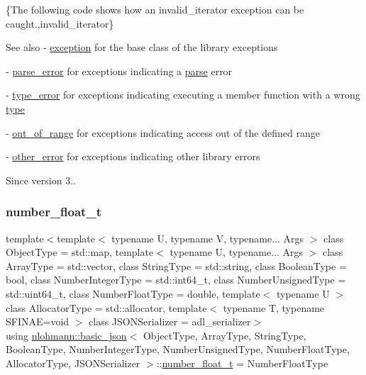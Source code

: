 \{The following code shows how an {\ttfamily invalid\+\_\+iterator} exception can be caught.,invalid\+\_\+iterator\}

\begin{DoxySeeAlso}{See also}
-\/ \mbox{\hyperlink{classnlohmann_1_1basic__json_a9a0aced019cb1d65bb49703406c84970}{exception}} for the base class of the library exceptions 

-\/ \mbox{\hyperlink{classnlohmann_1_1basic__json_af1efc2468e6022be6e35fc2944cabe4d}{parse\+\_\+error}} for exceptions indicating a \mbox{\hyperlink{classnlohmann_1_1basic__json_a265a473e939184aa42655c9ccdf34e58}{parse}} error 

-\/ \mbox{\hyperlink{classnlohmann_1_1basic__json_a4010e8e268fefd86da773c10318f2902}{type\+\_\+error}} for exceptions indicating executing a member function with a wrong \mbox{\hyperlink{classnlohmann_1_1basic__json_a2b2d781d7f2a4ee41bc0016e931cadf7}{type}} 

-\/ \mbox{\hyperlink{classnlohmann_1_1basic__json_a28f7c2f087274a0012eb7a2333ee1580}{out\+\_\+of\+\_\+range}} for exceptions indicating access out of the defined range 

-\/ \mbox{\hyperlink{classnlohmann_1_1basic__json_a3333a5a8714912adda33a35b369f7b3d}{other\+\_\+error}} for exceptions indicating other library errors
\end{DoxySeeAlso}
\begin{DoxySince}{Since}
version 3.. 
\end{DoxySince}
\mbox{\label{classnlohmann_1_1basic__json_a88d6103cb3620410b35200ee8e313d97}} 
\subsubsection{\texorpdfstring{number\+\_\+float\+\_\+t}{number\_float\_t}}
{\footnotesize\ttfamily template$<$template$<$ typename U, typename V, typename... Args $>$ class Object\+Type = std\+::map, template$<$ typename U, typename... Args $>$ class Array\+Type = std\+::vector, class String\+Type  = std\+::string, class Boolean\+Type  = bool, class Number\+Integer\+Type  = std\+::int64\+\_\+t, class Number\+Unsigned\+Type  = std\+::uint64\+\_\+t, class Number\+Float\+Type  = double, template$<$ typename U $>$ class Allocator\+Type = std\+::allocator, template$<$ typename T, typename S\+F\+I\+N\+A\+E=void $>$ class J\+S\+O\+N\+Serializer = adl\+\_\+serializer$>$ \\
using \mbox{\hyperlink{classnlohmann_1_1basic__json}{nlohmann\+::basic\+\_\+json}}$<$ Object\+Type, Array\+Type, String\+Type, Boolean\+Type, Number\+Integer\+Type, Number\+Unsigned\+Type, Number\+Float\+Type, Allocator\+Type, J\+S\+O\+N\+Serializer $>$\+::\mbox{\hyperlink{classnlohmann_1_1basic__json_a88d6103cb3620410b35200ee8e313d97}{number\+\_\+float\+\_\+t}} =  Number\+Float\+Type}



